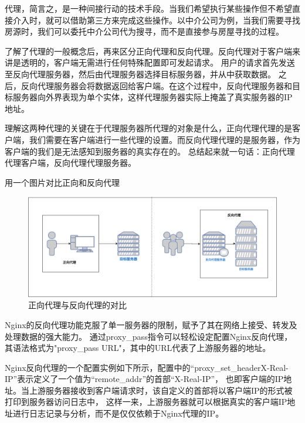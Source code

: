 代理，简言之，是一种间接行动的技术手段。当我们希望执行某些操作但不希望直接介入时，就可以借助第三方来完成这些操作。以中介公司为例，当我们需要寻找房源时，我们可以委托中介公司代为搜寻，而不是直接参与房屋寻找的过程。

了解了代理的一般概念后，再来区分正向代理和反向代理。反向代理对于客户端来讲是透明的，客户端无需进行任何特殊配置即可发起请求。
用户的请求首先发送至反向代理服务器，然后由代理服务器选择目标服务器，并从中获取数据。
之后，反向代理服务器会将数据返回给客户端。在这个过程中，反向代理服务器和目标服务器向外界表现为单个实体，这样代理服务器实际上掩盖了真实服务器的IP地址。

理解这两种代理的关键在于代理服务器所代理的对象是什么，正向代理代理的是客户端，我们需要在客户端进行一些代理的设置。而反向代理代理的是服务器，作为客户端的我们是无法感知到服务器的真实存在的。
总结起来就一句话：正向代理代理客户端，反向代理代理服务器\cite{崔娟2023基于Nginx反向代理解决公网上服务跨域问题的研究}。

用一个图片对比正向和反向代理

\begin{figure}[htb]
	\centering
	\includegraphics[width=\textwidth]{figures/Forward-Proxy-Reverse-Proxy.png}
	\caption{正向代理与反向代理的对比}
\end{figure}

Nginx的反向代理功能克服了单一服务器的限制，赋予了其在网络上接受、转发及处理数据的强大能力\cite{马原龙2016nginx}。
通过proxy\_pass指令可以轻松设定配置Nginx反向代理，其语法格式为"proxy\_pass URL"，其中的URL代表了上游服务器的地址。

Nginx反向代理的一个配置实例如下所示，配置中的“proxy\_set\_headerX-Real-IP”表示定义了一个值为“remote\_addr”的首部“X-Real-IP”，
也即客户端的IP地址。当上游服务器接收到客户端请求时，该自定义的首部将以客户端IP的形式被打印到服务器访问日志中，
这样一来，上游服务器就可以根据真实的客户端IP地址进行日志记录与分析，而不是仅仅依赖于Nginx代理的IP\cite{吴陈2020基于Nginx的服务器集群负载均衡策略的研究与改进}。

